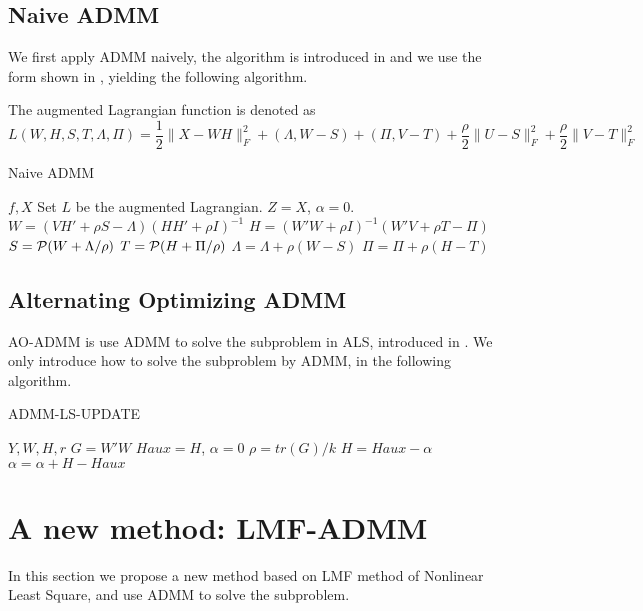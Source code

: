 \documentclass{article}
\begin{document}
\subsection{Naive ADMM}
We first apply ADMM naively, the algorithm is introduced in \cite{CITE} and we use the form shown in \cite{rk1admm}, yielding the following algorithm.

The augmented Lagrangian function is denoted as 
$$L(W,H,S,T,\Lambda, \Pi) = \frac{1}{2} \|X - WH\|_F^2 +  (\Lambda, W-S) + (\Pi, V-T) + \frac{\rho}{2}\|U-S\|_F^2 + \frac{\rho}{2} \|V-T\|_F^2$$

\begin{algorithm}
	\caption{Naive ADMM}
	\begin{algorithmic}[1]
		\REQUIRE $f, X$
		\STATE Set $L$ be the augmented Lagrangian.
		\STATE $Z = X$, $\alpha = 0$.
    \STATE $W = (VH'+\rho S-\Lambda)(HH'+\rho I)^{-1}$
\STATE $H = (W'W+\rho I)^{-1}(W'V+\rho T-\Pi)$
\STATE $S = \P(W + \Lambda/\rho)$
\STATE $T = \P(H + \Pi/\rho)$
\STATE $\Lambda = \Lambda + \rho(W-S)$
\STATE $\Pi = \Pi + \rho(H-T)$
		\ENDWHILE
	\end{algorithmic}
\end{algorithm}

\subsection{Alternating Optimizing ADMM}
AO-ADMM is use ADMM to solve the subproblem in ALS, introduced in \cite{aoadmm}. We only introduce how to solve the subproblem by ADMM, in the following algorithm.
\begin{algorithm}[H]
	\caption{ADMM-LS-UPDATE}
	\begin{algorithmic}[1]
		\REQUIRE $Y,W,H,r$
		\STATE $G = W'W$
		\STATE $Haux = H$, $\alpha = 0$
		\STATE $\rho = tr(G)/k$
		\STATE $H= Haux - \alpha$
		\STATE $\alpha = \alpha + H - Haux$
		\ENDFOR
	\end{algorithmic}
\end{algorithm}

\section{A new method: LMF-ADMM}
In this section we propose a new method based on LMF method of Nonlinear Least Square, and use ADMM to solve the subproblem.
\end{document}
